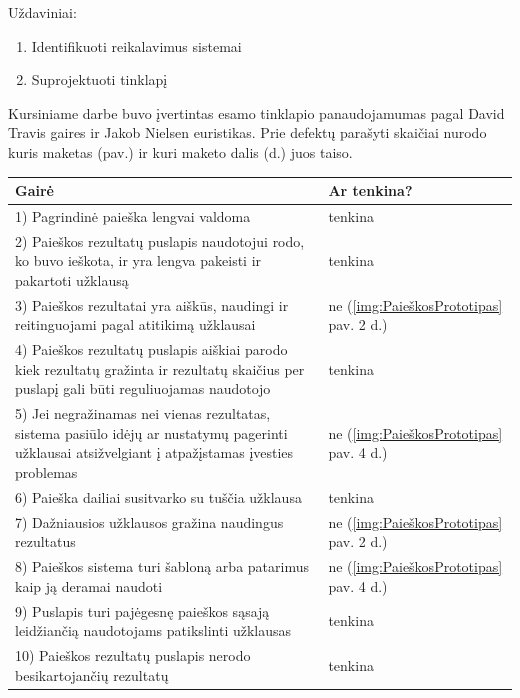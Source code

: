 \documentclass{VUMIFPSkursinis}
\begin{document}
Uždaviniai:
\begin{enumerate}
	\item Identifikuoti reikalavimus sistemai
	\item Suprojektuoti tinklapį
\end{enumerate}

Kursiniame darbe buvo įvertintas esamo tinklapio panaudojamumas\cite{Kursinis} pagal David Travis gaires\cite{SearchGuidelinesEn}\cite{NavigationAndIAGuidelinesEn} ir Jakob Nielsen euristikas\cite{NielsenHeuristicsEn}. Prie defektų parašyti skaičiai nurodo kuris maketas (pav.) ir kuri maketo dalis (d.) juos taiso.

\begin{center}
\begin{tabular}{ |p{13cm}|p{}| } 
 \hline
	Gairė & Ar tenkina? \\ \hline
	1) Pagrindinė paieška lengvai valdoma & tenkina \\ \hline
	2) Paieškos rezultatų puslapis naudotojui rodo, ko buvo ieškota, ir yra lengva pakeisti ir pakartoti užklausą & tenkina \\ \hline
	3) Paieškos rezultatai yra aiškūs, naudingi ir reitinguojami pagal atitikimą užklausai & ne (\ref{img:PaieškosPrototipas} pav. 2 d.) \\ \hline
	4) Paieškos rezultatų puslapis aiškiai parodo kiek rezultatų gražinta ir rezultatų skaičius per puslapį gali būti reguliuojamas naudotojo & tenkina \\ \hline
	5) Jei negražinamas nei vienas rezultatas, sistema pasiūlo idėjų ar nustatymų pagerinti užklausai atsižvelgiant į atpažįstamas įvesties problemas & ne (\ref{img:PaieškosPrototipas} pav. 4 d.) \\ \hline
	6) Paieška dailiai susitvarko su tuščia užklausa & tenkina \\ \hline
	7) Dažniausios užklausos gražina naudingus rezultatus & ne (\ref{img:PaieškosPrototipas} pav. 2 d.) \\ \hline
	8) Paieškos sistema turi šabloną arba patarimus kaip ją deramai naudoti & ne (\ref{img:PaieškosPrototipas} pav. 4 d.) \\ \hline
	9) Puslapis turi pajėgesnę paieškos sąsają leidžiančią naudotojams patikslinti užklausas & tenkina \\ \hline
	10) Paieškos rezultatų puslapis nerodo besikartojančių rezultatų & tenkina \\ \hline

\end{tabular}
\end{center}
\end{document}
